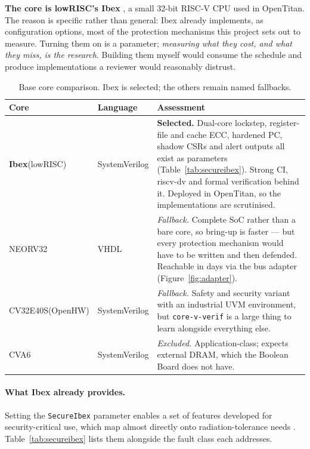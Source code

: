 \documentclass[11pt,a4paper]{article}
\begin{document}
\textbf{The core is lowRISC's Ibex} \cite{ibex}, a small 32-bit RISC-V CPU used
in OpenTitan. The reason is specific rather than general: Ibex already implements,
as configuration options, most of the protection mechanisms this project sets out
to measure. Turning them on is a parameter; \emph{measuring what they cost, and
what they miss, is the research}. Building them myself would consume the schedule
and produce implementations a reviewer would reasonably distrust.

\begin{table}[htbp]
\centering
\caption{Base core comparison. Ibex is selected; the others remain named
fallbacks.}
\label{tab:cores}
\small
\begin{tabularx}{\textwidth}{@{}L{2.4cm} L{2.2cm} X@{}}
\toprule
\textbf{Core} & \textbf{Language} & \textbf{Assessment} \\
\midrule
\textbf{Ibex}\newline (lowRISC) & SystemVerilog &
\textbf{Selected.} Dual-core lockstep, register-file and cache ECC, hardened PC,
shadow CSRs and alert outputs all exist as parameters
(Table~\ref{tab:secureibex}). Strong CI, riscv-dv and formal verification behind
it. Deployed in OpenTitan, so the implementations are scrutinised. \\
NEORV32 \cite{neorv32} & VHDL &
\emph{Fallback.} Complete SoC rather than a bare core, so bring-up is faster ---
but every protection mechanism would have to be written and then defended.
Reachable in days via the bus adapter (Figure~\ref{fig:adapter}). \\
CV32E40S\newline (OpenHW) & SystemVerilog &
\emph{Fallback.} Safety and security variant with an industrial UVM environment,
but \texttt{core-v-verif} is a large thing to learn alongside everything else. \\
CVA6 \cite{cva6repo} & SystemVerilog &
\emph{Excluded.} Application-class; expects external DRAM, which the Boolean
Board does not have. \\
\bottomrule
\end{tabularx}
\end{table}

\paragraph{What Ibex already provides.}
Setting the \texttt{SecureIbex} parameter enables a set of features developed for
security-critical use, which map almost directly onto radiation-tolerance needs
\cite{ibexsecurity}. Table~\ref{tab:secureibex} lists them alongside the fault
class each addresses.
\end{document}
